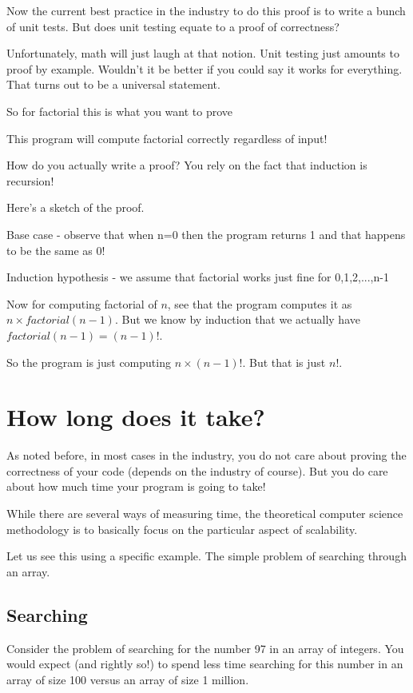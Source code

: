\documentclass[12pt]{article}
\begin{document}
Now the current best practice in the industry to do this proof is to write a bunch of unit tests. But does unit testing equate to a proof of correctness?

Unfortunately, math will just laugh at that notion. Unit testing just amounts to proof by example. Wouldn't it be better if you could say it works for everything. That turns out to be a universal statement.

\medskip

So for factorial this is what you want to prove

This program will compute factorial correctly regardless of input! 

How do you actually write a proof? You rely on the fact that induction is recursion!

Here's a sketch of the proof.

Base case - observe that when n=0 then the program returns 1 and that happens to be the same as 0!

Induction hypothesis - we assume that factorial works just fine for 0,1,2,...,n-1

Now for computing factorial of $n$, see that the program computes it as $n \times factorial(n-1)$. But we know by induction that we actually have $factorial(n-1) = (n-1)!$.

So the program is just computing $n \times (n-1)!$. But that is just $n!$.

\section*{How long does it take?}

As noted before, in most cases in the industry, you do not care about proving the correctness of your code (depends on the industry of course). But you do care about how much time your program is going to take!

While there are several ways of measuring time, the theoretical computer science methodology is to basically focus on the particular aspect of scalability. 

Let us see this using a specific example. The simple problem of searching through an array.

\subsection*{Searching}

Consider the problem of searching for the number 97 in an array of integers. You would expect (and rightly so!) to spend less time searching for this number in an array of size 100 versus an array of size 1 million. 
\end{document}
